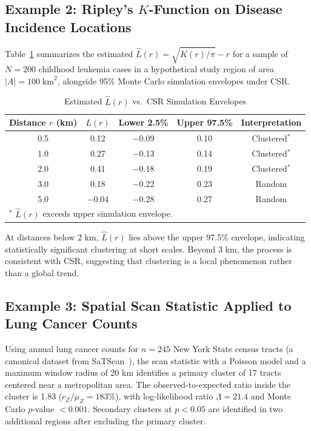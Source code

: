 \documentclass[conference]{IEEEtran}
\theoremstyle{definition}
\begin{document}
\subsection{Example 2: Ripley's $K$-Function on Disease Incidence Locations}

Table~\ref{tab:kfunction} summarizes the estimated $\hat{L}(r) = \sqrt{\hat{K}(r)/\pi} - r$ for a sample of $N = 200$ childhood leukemia cases in a hypothetical study region of area $|A| = 100\;\text{km}^2$, alongside 95\% Monte Carlo simulation envelopes under CSR.

\begin{table}[!t]
\caption{Estimated $\hat{L}(r)$ vs.\ CSR Simulation Envelopes}
\label{tab:kfunction}
\centering
\begin{tabular}{@{}ccccc@{}}
\toprule
Distance $r$ (km) & $\hat{L}(r)$ & Lower 2.5\% & Upper 97.5\% & Interpretation \\
\midrule
0.5  & 0.12 & $-$0.09 & 0.10 & Clustered$^*$ \\
1.0  & 0.27 & $-$0.13 & 0.14 & Clustered$^*$ \\
2.0  & 0.41 & $-$0.18 & 0.19 & Clustered$^*$ \\
3.0  & 0.18 & $-$0.22 & 0.23 & Random \\
5.0  & $-$0.04 & $-$0.28 & 0.27 & Random \\
\bottomrule
\multicolumn{5}{l}{$^*$ $\hat{L}(r)$ exceeds upper simulation envelope.}
\end{tabular}
\end{table}

At distances below 2 km, $\hat{L}(r)$ lies above the upper 97.5\% envelope, indicating statistically significant clustering at short scales. Beyond 3 km, the process is consistent with CSR, suggesting that clustering is a local phenomenon rather than a global trend.

\subsection{Example 3: Spatial Scan Statistic Applied to Lung Cancer Counts}

Using annual lung cancer counts for $n = 245$ New York State census tracts (a canonical dataset from SaTScan~\cite{kulldorff1997}), the scan statistic with a Poisson model and a maximum window radius of 20 km identifies a primary cluster of 17 tracts centered near a metropolitan area. The observed-to-expected ratio inside the cluster is 1.83 ($c_Z / \mu_Z = 183\%$), with log-likelihood ratio $\Lambda = 21.4$ and Monte Carlo $p$-value $< 0.001$. Secondary clusters at $p < 0.05$ are identified in two additional regions after excluding the primary cluster.
\end{document}
